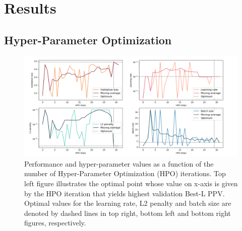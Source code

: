 \chapter{Results}

\section{Hyper-Parameter Optimization}

    \begin{figure}[H]
        \begin{center}
            \includegraphics[width=\textwidth, keepaspectratio]{imgs/hpo.png}
            \caption{Performance and hyper-parameter values as a function of the number
            of Hyper-Parameter Optimization (HPO) iterations.
            Top left figure illustrates the optimal point whose value on x-axis
            is given by the HPO iteration that yields highest validation Best-L PPV.
            Optimal values for the learning rate, L2 penalty and batch size are denoted
            by dashed lines in top right, bottom left and bottom right figures, respectively.}
            \label{hpoparams}
        \end{center}
    \end{figure}

